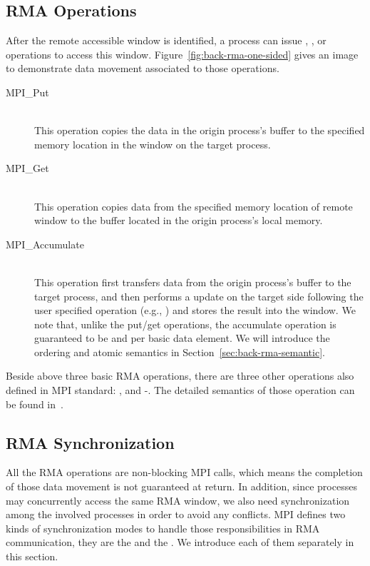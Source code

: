 \subsection{RMA Operations}

After the remote accessible window is identified, a process can issue
, , or  operations to access this
window. Figure~\ref{fig:back-rma-one-sided} gives an image to demonstrate
data movement associated to those operations.

\begin{description}
\item[MPI\_Put]\hfill \\
This operation copies the data in the origin process's buffer to
the specified memory location in the window on the target process.

\item[MPI\_Get]\hfill \\
This operation copies data from the specified memory location
of remote window to the buffer located in the origin process's
local memory.

\item[MPI\_Accumulate]\hfill \\
This operation first transfers data from the origin process's buffer
to the target process, and then performs a update on the target side
following the user specified operation (e.g., ) and stores
the result into the window. We note that, unlike the put\slash get
operations, the accumulate operation is guaranteed to be  and
 per basic data element. We will introduce the ordering and
atomic semantics in Section~\ref{sec:back-rma-semantic}.
\end{description}

Beside above three basic RMA operations, there are three other
operations also defined in MPI standard: ,
 and -. The detailed
semantics of those operation can be found in~\cite{mpi30-report}.

\subsection{RMA Synchronization}

All the RMA operations are non-blocking MPI calls, which means the completion
of those data movement is not guaranteed at return. In addition, since processes
may concurrently access the same RMA window, we also need synchronization
among the involved processes in order to avoid any conflicts. MPI defines two
kinds of synchronization modes to handle those responsibilities in RMA communication,
they are the  and the . We introduce
each of them separately in this section.

